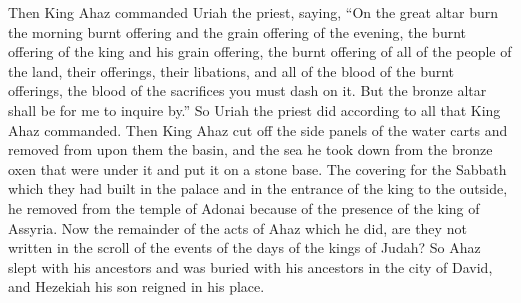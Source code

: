 \begin{biblechapter}
\verse Then King Ahaz commanded Uriah the priest, saying, “On the great altar burn the morning burnt offering and the grain offering of the evening, the burnt offering of the king and his grain offering, the burnt offering of all of the people of the land, their offerings, their libations, and all of the blood of the burnt offerings, the blood of the sacrifices you must dash on it. But the bronze altar shall be for me to inquire by.”
\verse So Uriah the priest did according to all that King Ahaz commanded.
\verse Then King Ahaz cut off the side panels of the water carts and removed from upon them the basin, and the sea he took down from the bronze oxen that were under it and put it on a stone base.
\verse The covering for the Sabbath which they had built in the palace and in the entrance of the king to the outside, he removed from the temple of Adonai because of the presence of the king of Assyria.
\verse Now the remainder of the acts of Ahaz which he did, are they not written in the scroll of the events of the days of the kings of Judah?
\verse So Ahaz slept with his ancestors and was buried with his ancestors in the city of David, and Hezekiah his son reigned in his place.
\end{biblechapter}

